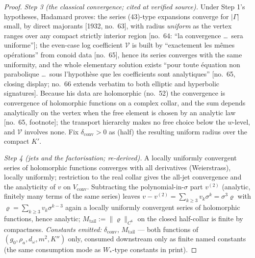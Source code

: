 \begin{proof}
\emph{Step 3 (the classical convergence; cited at verified source).} Under
Step 1's hypotheses, Hadamard proves: the series (43)-type expansions
converge for $|\Gamma|$ small, by direct majorants [1932, no.~63], with
radius \emph{uniform} as the vertex ranges over any compact strictly
interior region [no.~64: ``la convergence \dots\ sera uniforme'']; the
even-case log coefficient $\mathcal V$ is built by ``exactement les m\^emes
op\'erations'' from conoid data [no.~65], hence its series converges with
the same uniformity, and the whole elementary solution exists ``pour toute
\'equation non parabolique \dots\ sous l'hypoth\`ese que les coefficients
sont analytiques'' [no.~65, closing display; no.~66 extends verbatim to both
elliptic and hyperbolic signatures]. Because his data are holomorphic
(no.~52) the convergence is convergence of holomorphic functions on a
complex collar, and the sum depends analytically on the vertex when the
free element is chosen by an analytic law [no.~65, footnote]; the transport
hierarchy makes no free choice below the $w$-level, and $\mathcal V$ involves
none. Fix $\delta_{\mathrm{conv}}>0$ as (half) the resulting uniform radius
over the compact $K'$.

\emph{Step 4 (jets and the factorisation; re-derived).} A locally uniformly
convergent series of holomorphic functions converges with all derivatives
(Weierstrass), locally uniformly; restriction to the real collar gives the
all-jet convergence and the analyticity of $v$ on $V_{\mathrm{conv}}$.
Subtracting the polynomial-in-$\sigma$ part $v^{(2)}$ (analytic, finitely
many terms of the same series) leaves $v-v^{(2)}=\sum_{k\ge3}v_k\sigma^k
=\sigma^3\varrho$ with $\varrho=\sum_{k\ge3}v_k\sigma^{k-3}$ again a locally
uniformly convergent series of holomorphic functions, hence analytic;
$M_{\mathrm{tail}}:=\|\varrho\|_{C^6}$ on the closed half-collar is finite
by compactness. \emph{Constants emitted:} $\delta_{\mathrm{conv}}$,
$M_{\mathrm{tail}}$ --- both functions of
$(g_0,\rho_a,d_\omega,m^2,K'')$ only, consumed downstream only as finite
named constants (the same consumption mode as $W_*$-type constants in
print).
\end{proof}

